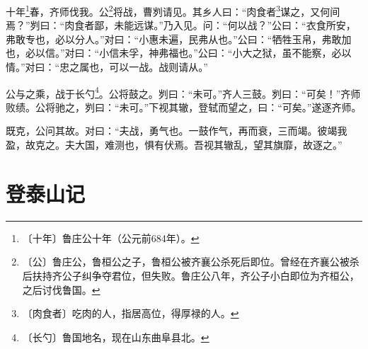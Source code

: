 \documentclass[12pt,UTF-8,openany]{ctexbook}
\begin{document}
\begin{normalsize}
    
    十年\footnote{〔十年〕鲁庄公十年（公元前684年）。}春，齐师伐我。公\footnote{〔公〕鲁庄公，鲁桓公之子，鲁桓公被齐襄公杀死后即位。曾经在齐襄公被杀后扶持齐公子纠争夺君位，但失败。鲁庄公八年，齐公子小白即位为齐桓公，之后讨伐鲁国。}将战，曹刿请见。其乡人曰：“肉食者\footnote{〔肉食者〕吃肉的人，指居高位，得厚禄的人。}谋之，又何间焉？”刿曰：“肉食者鄙，未能远谋。”乃入见。问：“何以战？”公曰：“衣食所安，弗敢专也，必以分人。”对曰：“小惠未遍，民弗从也。”公曰：“牺牲玉帛，弗敢加也，必以信。”对曰：“小信未孚，神弗福也。”公曰：“小大之狱，虽不能察，必以情。”对曰：“忠之属也，可以一战。战则请从。”
    
    公与之乘，战于长勺\footnote{〔长勺〕鲁国地名，现在山东曲阜县北。}。公将鼓之。刿曰：“未可。”齐人三鼓。刿曰：“可矣！”齐师败绩。公将驰之，刿曰：“未可。”下视其辙，登轼而望之，曰：“可矣。”遂逐齐师。
    
    既克，公问其故。对曰：“夫战，勇气也。一鼓作气，再而衰，三而竭。彼竭我盈，故克之。夫大国，难测也，惧有伏焉。吾视其辙乱，望其旗靡，故逐之。”
\end{normalsize}



\chapter{登泰山记}
\end{document}

